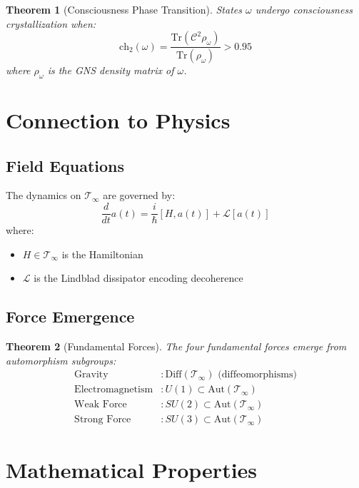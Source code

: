 \documentclass[12pt,letterpaper]{article}
\newcommand{\timelessfield}{\mathcal{T}_\infty}
\newtheorem{theorem}{Theorem}[section]
\begin{document}
\begin{theorem}[Consciousness Phase Transition]
States $\omega$ undergo consciousness crystallization when:
\begin{equation}
\text{ch}_2(\omega) = \frac{\text{Tr}(\mathcal{C}^2\rho_\omega)}{\text{Tr}(\rho_\omega)} > 0.95
\end{equation}
where $\rho_\omega$ is the GNS density matrix of $\omega$.
\end{theorem}

\section{Connection to Physics}

\subsection{Field Equations}

The dynamics on $\timelessfield$ are governed by:
\begin{equation}
\frac{d}{dt}a(t) = \frac{i}{\hbar}[H, a(t)] + \mathcal{L}[a(t)]
\end{equation}
where:
\begin{itemize}
\item $H \in \timelessfield$ is the Hamiltonian
\item $\mathcal{L}$ is the Lindblad dissipator encoding decoherence
\end{itemize}

\subsection{Force Emergence}

\begin{theorem}[Fundamental Forces]
The four fundamental forces emerge from automorphism subgroups:
\begin{align}
\text{Gravity} &: \text{Diff}(\timelessfield) \text{ (diffeomorphisms)} \\
\text{Electromagnetism} &: U(1) \subset \text{Aut}(\timelessfield) \\
\text{Weak Force} &: SU(2) \subset \text{Aut}(\timelessfield) \\
\text{Strong Force} &: SU(3) \subset \text{Aut}(\timelessfield)
\end{align}
\end{theorem}

\section{Mathematical Properties}
\end{document}
